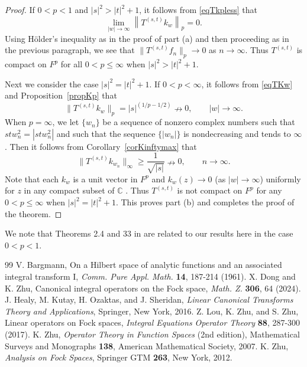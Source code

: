 \documentclass[reqno]{amsart}
\newcommand{\C}{{\mathbb C}}
\begin{document}
\begin{proof}
If $0<p<1$ and $|s|^2>|t|^2+1$, it follows from \eqref{eqTkpless} that
$$\lim_{|w|\rightarrow\infty}\left\|T^{(s,t)}k_w\right\|_p=0.$$
Using H\"{o}lder's inequality as in the proof of part (a) and then
proceeding as in the previous paragraph, we see that
$\|T^{(s, t)}f_n\|_p\rightarrow 0$ as $n\rightarrow\infty$.
Thus $T^{(s,t)}$ is compact on $F^p$ for all $0<p\le\infty$ when
$|s|^2>|t|^2+1$.

Next we consider the case $|s|^2=|t|^2+1$. If $0< p<\infty$, it
follows from \eqref{eqTKw} and Proposition~\ref{propKp} that
$$\|T^{(s,t)}k_w\|_p=|s|^{(1/p-1/2)}\nrightarrow 0,
\qquad |w|\rightarrow\infty.$$
When $p=\infty$, we let $\{w_n\}$ be a sequence of nonzero
complex numbers such that $stw_n^2=|stw_n^2|$ and such that
the sequence $\{|w_n|\}$ is nondecreasing and tends to $\infty$.
Then it follows from Corollary~\ref{corKinftymax} that
$$\|T^{(s,t)}k_{w_n}\|_\infty\geq \frac{1}{\sqrt{|s|}}\nrightarrow 0,
\qquad n\rightarrow\infty.$$
Note that each $k_w$ is a unit vector in $F^p$ and $k_w(z)\to0$
(as $|w|\rightarrow\infty$) uniformly for $z$ in any compact subset
of $\C$ . Thus $T^{(s,t)}$ is not compact on $F^p$ for
any $0<p\le\infty$ when $|s|^2=|t|^2+1$. This proves part (b) and
completes the proof of the theorem.
\end{proof}

We note that Theorems 2.4 and 33 in \cite{LZZ} are related to our
results here in the case $0<p<1$.



\begin{thebibliography}{99}
 V. Bargmann, On a Hilbert space of analytic functions
and an associated integral transform I, \textit{Comm. Pure Appl. Math.}
\textbf{14}, 187-214 (1961).
 X. Dong and K. Zhu,  Canonical integral operators on
the Fock space, \textit{Math. Z.} \textbf{306}, 64 (2024).
 J. Healy, M. Kutay, H. Ozaktas, and J. Sheridan, 
\textit{Linear Canonical Transforms Theory and Applications}, 
Springer, New York, 2016.
 Z. Lou, K. Zhu, and S. Zhu, Linear operators on Fock spaces,
\textit{Integral Equations Operator Theory} \textbf{88}, 287-300 (2017).
 K. Zhu, \textit{Operator Theory in Function Spaces}
(2nd edition), Mathematical Surveys and Monographs {\bf 138},
American Mathematical Society, 2007.
 K. Zhu, \textit{Analysis on Fock Spaces},
Springer GTM {\bf 263}, New York, 2012.
\end{thebibliography}
\end{document}
